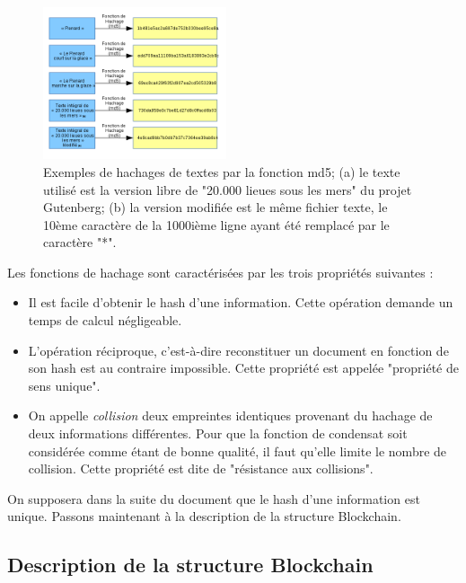 \documentclass{article}
\begin{document}
\begin{figure}
    \vspace{-20pt}
    \includegraphics[width=0.48\textwidth]{500px-Hachagesvg.png}
    \caption{Exemples de hachages de textes par la fonction md5; (a) le texte utilisé est la version libre de "20.000 lieues sous les mers" du projet Gutenberg; (b) la version modifiée est le même fichier texte, le 10ème caractère de la 1000ième ligne ayant été remplacé par le caractère "*".}
    \vspace{-20pt}
\end{figure}

Les fonctions de hachage sont caractérisées par les trois propriétés suivantes : 

\begin{itemize}
    \item Il est facile d'obtenir le hash d'une information. Cette opération demande un temps de calcul négligeable.
    \item L'opération réciproque, c'est-à-dire reconstituer un document en fonction de son hash est au contraire impossible. Cette propriété est appelée "propriété de sens unique".
    
    \item On appelle \textit{collision} deux empreintes identiques provenant du hachage de deux informations différentes. Pour que la fonction de condensat soit considérée comme étant de bonne qualité, il faut qu'elle limite le nombre de collision. Cette propriété est dite de "résistance aux collisions". 
\end{itemize}

On supposera dans la suite du document que le hash d'une information est unique. Passons maintenant à la description de la structure Blockchain.

\subsection{Description de la structure Blockchain}
\end{document}
